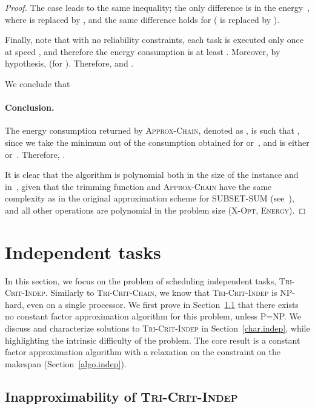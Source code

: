 \documentclass[a4paper]{article}
\theoremstyle{plain}
\theoremstyle{definition}
\theoremstyle{remark}
\newcommand{\energy}{\textsc{Energy}} \newcommand{\exe}{\ensuremath{\mathcal{E}\!xe}\xspace}
\newcommand{\approxchain}{\textsc{Ap\-prox-Chain}}
\newcommand{\xopt}{\textsc{X-Opt}}
\newcommand{\chain}{\textsc{Tri-Crit-Chain}\xspace}
\newcommand{\indep}{\textsc{Tri-Crit-In\-dep}\xspace}
\begin{document}
\begin{proof}
The case  leads to the same inequality; the only difference is in
the energy~, where  is replaced by , and the
same difference holds for  ( is replaced by
). 

Finally, note that with no reliability constraints, each task is
executed only once at speed , and therefore the energy
consumption is at least . Moreover, by
hypothesis,  (for ). Therefore,
 and .


\medskip
We conclude that 



\paragraph{Conclusion. }
The energy consumption returned by \approxchain\xspace, denoted as
, is such that , since we take the minimum
out of the consumption obtained for  or~, and  is
either  or~. Therefore, . 

It is clear that the algorithm is polynomial both in the size of the
instance and in~, given that the trimming
function and \approxchain\xspace have the same complexity as in the
original approximation scheme for SUB\-SET-SUM (see~\cite{cormen}), and
all other operations are polynomial in the problem size (\xopt,
\energy). 
\end{proof}


\section{Independent tasks}
\label{sec.indep}
    
In this section, we focus on the problem of scheduling independent
tasks, \indep. Similarly to \chain, we know that \indep is NP-hard,
even on a single processor. We first prove in
Section~\ref{sec.inapprox} that there exists no constant factor
approximation algorithm for this problem, unless P=NP. We discuss and
characterize solutions to \indep in Section~\ref{char.indep}, while
highlighting the intrinsic difficulty of the problem. The core result
is a constant factor approximation algorithm with a relaxation on the
constraint on the makespan (Section~\ref{algo.indep}).





\subsection{Inapproximability of \indep}
\label{sec.inapprox}
\end{document}
